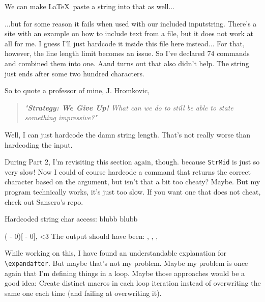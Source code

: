 \documentclass{article} \usepackage[utf8]{inputenc}
\newcommand{\code}[1]{\colorbox{codebggray}{{\texttt{#1}}}}
\begin{document}
We can make \LaTeX\, paste a string into that as well...

\begin{mycode}
\def\mystr{hello}
\def\mystrtwo{\mystr}

\end{mycode}
\def\mystr{hello}
\def\mystrtwo{\mystr}

...but for some reason it fails when used with our included inputstring. There's a site with an example on how to include text from a file, but it does not work at all for me. I guess I'll just hardcode it inside this file here instead... For that, however, the line length limit becomes an issue. So I've declared 74 commands and combined them into one. Aand turns out that also didn't help. The string just ends after some two hundred characters.

So to quote a professor of mine, J. Hromkovic, 
\begin{quote}\textit{"\textbf{Strategy: We Give Up!} What can we do to still be able to state something impressive?"}\end{quote}
Well, I can just hardcode the damn string length. That's not really worse than hardcoding the input.

During Part 2, I'm revisiting this section again, though. because \code{StrMid} is just so very slow! Now I could of course hardcode a command that returns the correct character based on the argument, but isn't that a bit too cheaty? Maybe. But my program technically works, it's just too slow. If you want one that does not cheat, check out Sansero's repo.

\def\totalpos{3}
Hardcoded string char access: blubb \lucidcharat{\the\numexpr \totalpos - 0} blubb

\setcounter{tmpbctr}{-1}
\loop
{}
\edef\tmpinput{\the\numexpr \value{tmpbctr} - 0}
\def\tmpchar{\expandafter\lucidcharat\tmpinput}
(\tmpinput )[\tmpchar],
\ifnum \value{tmpbctr}<3
\repeat
\newline
The output should have been: , , ,

While working on this, I have found an understandable explanation for \code{\textbackslash expandafter}.
But maybe that's not my problem. Maybe my problem is once again that I'm defining things in a loop. Maybe those approaches would be a good idea: Create distinct macros in each loop iteration instead of overwriting the same one each time (and failing at overwriting it).
\end{document}
